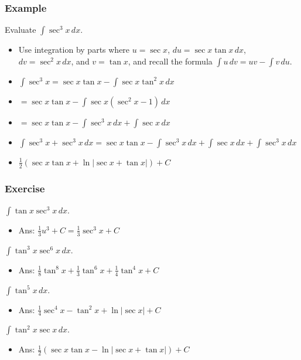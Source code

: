 \documentclass[t]{beamer}
\theoremstyle{plain}
\theoremstyle{definition}
\newcommand{\ds}{\displaystyle}
\newcommand{\dx}{\,dx}
\begin{document}
\begin{frame}
\frametitle{Example} 

\footnotesize

Evaluate $\ds\int\sec^3x \,dx$. \pause

\begin{itemize}
	\item Use integration by parts where $u = \sec{x}$, $du = \sec x \tan x \dx$, $dv = \sec^2x \,dx$, and $v = \tan {x}$,  and recall the formula $\ds\int u\, dv = uv - \int v \, du.$
	\item $\ds \int \sec^3{x} = \sec x \tan x - \int \sec x \tan^2 x \,dx $
	\item $ = \sec x \tan x - \ds\int \sec x (\sec^2 x - 1) \,dx $
	\item $ = \sec x \tan x - \ds\int \sec ^3 x \,dx+  \int \sec x \,dx $
	\item $ \ds \int \sec^3{x} + \sec ^3 x \,dx = \sec x \tan x - \int \sec ^3 x \,dx +  \int \sec x \,dx +  \int \sec ^3 x \,dx$
	\item $\frac{1}{2} (\sec x \tan x  + \ln |\sec {x} + \tan{x}|) + C$
\end{itemize}

\end{frame}

\begin{frame}
\frametitle{Exercise} 

$\ds\int\tan x\sec^3x\,dx$. %
\begin{itemize}
	\item Ans: $\ds\frac{1}{3}u^3 + C = \frac{1}{3}\sec^3{x} + C$
\end{itemize}
$\ds\int\tan^3x\sec^6x\,dx$. %
\begin{itemize}
	\item Ans: $\ds\frac{1}{8}\tan^8{x} + \frac{1}{3}\tan^6{x} + \frac{1}{4}\tan^4{x} + C$
\end{itemize}
$\ds\int\tan^5x\,dx$. %
\begin{itemize}
	\item Ans: $\frac{1}{4}\sec^4{x} - \tan^2{x} + \ln |{\sec{x}}| + C$
\end{itemize}
$\ds\int\tan^2x\sec x\,dx$. %
\begin{itemize}
	\item Ans: $\ds\frac{1}{2} (\sec x \tan x - \ln |\sec{x} + \tan{x}|)  + C$
\end{itemize}

\end{frame}
\end{document}

